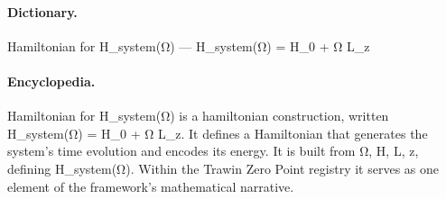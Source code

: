 \paragraph{Dictionary.}
Hamiltonian for H\_system(Ω) — H\_system(Ω) = H\_0 + Ω L\_z

\paragraph{Encyclopedia.}
Hamiltonian for H\_system(Ω) is a hamiltonian construction, written H\_system(Ω) = H\_0 + Ω L\_z. It defines a Hamiltonian that generates the system's time evolution and encodes its energy. It is built from Ω, H, L, z, defining H\_system(Ω). Within the Trawin Zero Point registry it serves as one element of the framework's mathematical narrative.
